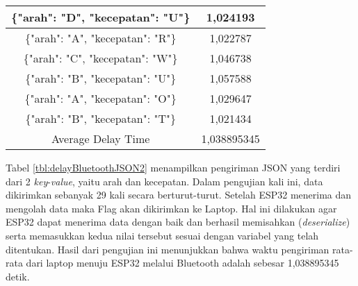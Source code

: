 \begin{table}[!ht]
\begin{tabular}{|c|c|}
  \{"arah": "D", "kecepatan": "U"\} & 1,024193    \\ \hline
  \{"arah": "A", "kecepatan": "R"\} & 1,022787    \\ \hline
  \{"arah": "C", "kecepatan": "W"\} & 1,046738    \\ \hline
  \{"arah": "B", "kecepatan": "U"\} & 1,057588    \\ \hline
  \{"arah": "A", "kecepatan": "O"\} & 1,029647    \\ \hline
  \{"arah": "B", "kecepatan": "T"\} & 1,021434    \\ \hline
  Average Delay Time                & 1,038895345 \\ \hline
  \end{tabular}
  \end{table}

Tabel \ref{tbl:delayBluetoothJSON2} menampilkan pengiriman JSON yang terdiri dari 2 \emph{key}-\emph{value}, yaitu arah dan kecepatan. Dalam pengujian kali ini, data dikirimkan sebanyak 29 kali secara berturut-turut. Setelah ESP32 menerima dan mengolah data maka Flag akan dikirimkan ke Laptop. Hal ini dilakukan agar ESP32 dapat menerima data dengan baik dan berhasil memisahkan (\emph{deserialize}) serta memasukkan kedua nilai tersebut sesuai dengan variabel yang telah ditentukan. Hasil dari pengujian ini menunjukkan bahwa waktu pengiriman rata-rata dari laptop menuju ESP32 melalui Bluetooth adalah sebesar 1,038895345 detik.

